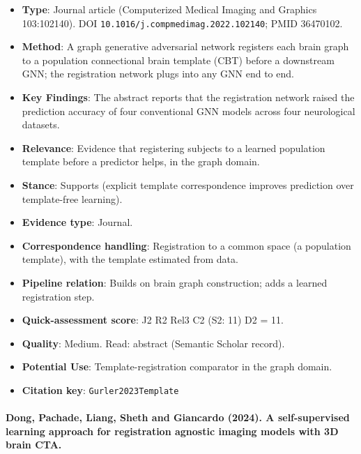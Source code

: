 \documentclass[journal,onecolumn]{IEEEtran}
\begin{document}
\begin{itemize}

\item{} \textbf{Type}: Journal article (Computerized Medical Imaging and Graphics 103:102140). DOI \nolinkurl{10.1016/j.compmedimag.2022.102140}; PMID 36470102.

\item{} \textbf{Method}: A graph generative adversarial network registers each brain graph to a population connectional brain template (CBT) before a downstream GNN; the registration network plugs into any GNN end to end.

\item{} \textbf{Key Findings}: The abstract reports that the registration network raised the prediction accuracy of four conventional GNN models across four neurological datasets.

\item{} \textbf{Relevance}: Evidence that registering subjects to a learned population template before a predictor helps, in the graph domain.

\item{} \textbf{Stance}: Supports (explicit template correspondence improves prediction over template-free learning).

\item{} \textbf{Evidence type}: Journal.

\item{} \textbf{Correspondence handling}: Registration to a common space (a population template), with the template estimated from data.

\item{} \textbf{Pipeline relation}: Builds on brain graph construction; adds a learned registration step.

\item{} \textbf{Quick-assessment score}: J2 R2 Rel3 C2 (S2: 11) D2 = 11.

\item{} \textbf{Quality}: Medium. Read: abstract (Semantic Scholar record).

\item{} \textbf{Potential Use}: Template-registration comparator in the graph domain.

\item{} \textbf{Citation key}: \texttt{Gurler2023Template}

\end{itemize}

\paragraph{Dong, Pachade, Liang, Sheth and Giancardo (2024). A self-supervised learning approach for registration agnostic imaging models with 3D brain CTA.~\cite{Dong2024Self}}\mbox{}
\end{document}
